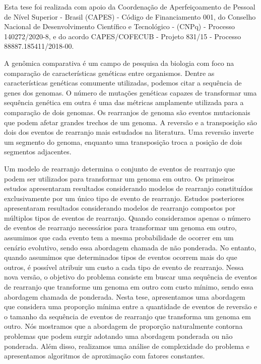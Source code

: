 \documentclass[Portugues]{ic-tese-v3}
\theoremstyle{definition}
\theoremstyle{remark}
\theoremstyle{definition}
\begin{document}
Esta tese foi realizada com apoio da Coordenação de Aperfeiçoamento de Pessoal de Nível Superior - Brasil (CAPES) - Código de Financiamento 001, do Conselho Nacional de Desenvolvimento Científico e Tecnológico - (CNPq) - Processo 140272/2020-8, e do acordo CAPES/COFECUB - Projeto 831/15 - Processo 88887.185411/2018-00.

\begin{resumo}
A genômica comparativa é um campo de pesquisa da biologia com foco na comparação de características genéticas entre organismos. Dentre as características genéticas comumente utilizadas, podemos citar a sequência de genes dos genomas. O número de mutações genéticas capazes de transformar uma sequência genética em outra é uma das métricas amplamente utilizada para a comparação de dois genomas. Os rearranjos de genoma são eventos mutacionais que podem afetar grandes trechos de um genoma. A reversão e a transposição são dois dos eventos de rearranjo mais estudados na literatura. Uma reversão inverte um segmento do genoma, enquanto uma transposição troca a posição de dois segmentos adjacentes.

Um modelo de rearranjo determina o conjunto de eventos de rearranjo que podem ser utilizados para transformar um genoma em outro. Os primeiros estudos apresentaram resultados considerando modelos de rearranjo constituídos exclusivamente por um único tipo de evento de rearranjo. Estudos posteriores apresentaram resultados considerando modelos de rearranjo compostos por múltiplos tipos de eventos de rearranjo. Quando consideramos apenas o número de eventos de rearranjo necessários para transformar um genoma em outro, assumimos que cada evento tem a mesma probabilidade de ocorrer em um cenário evolutivo, sendo essa abordagem chamada de não ponderada. No entanto, quando assumimos que determinados tipos de eventos ocorrem mais do que outros, é possível atribuir um custo a cada tipo de evento de rearranjo. Nessa nova versão, o objetivo do problema consiste em buscar uma sequência de eventos de rearranjo que transforme um genoma em outro com custo mínimo, sendo essa abordagem chamada de ponderada. Nesta tese, apresentamos uma abordagem que considera uma proporção mínima entre a quantidade de eventos de reversão e o tamanho da sequência de eventos de rearranjo que transforma um genoma em outro. Nós mostramos que a abordagem de proporção naturalmente contorna problemas que podem surgir adotando uma abordagem ponderada ou não ponderada. Além disso, realizamos uma análise de complexidade do problema e apresentamos algoritmos de aproximação com fatores constantes.


\end{resumo}
\end{document}
